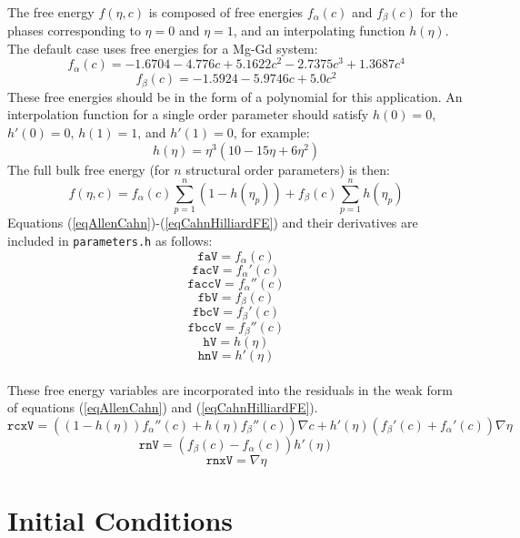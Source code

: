 \documentclass[11pt]{article}
\begin{document}
\paragraph{}
The free energy $f(\eta,c)$ is composed of free energies $f_\alpha(c)$ and $f_\beta(c)$ for the phases corresponding to $\eta=0$ and $\eta=1$, and an interpolating function $h(\eta)$.  The default case uses free energies for a Mg-Gd system:
\begin{equation}
f_\alpha(c)=-1.6704 -4.776 c+5.1622 c^2 -2.7375 c^3 +1.3687 c^4
\end{equation}
\begin{equation}
f_\beta(c)=-1.5924 -5.9746 c+5.0 c^2
\end{equation}
These free energies should be in the form of a polynomial for this application.  An interpolation function for a single order parameter should satisfy $h(0)=0$, $h'(0)=0$, $h(1)=1$, and $h'(1)=0$, for example:
\begin{equation}
h(\eta)= \eta^3 (10 - 15 \eta + 6 \eta^2)
\end{equation}
The full bulk free energy (for $n$ structural order parameters) is then:
\begin{equation}
f(\eta, c)= f_\alpha(c) \sum_{p=1}^n (1-h(\eta_p)) + f_\beta(c) \sum_{p=1}^n h(\eta_p)
\end{equation}
Equations (\ref{eqAllenCahn})-(\ref{eqCahnHilliardFE}) and their derivatives are included in \texttt{parameters.h} as follows:
\[ \texttt{faV} = f_\alpha(c) \]
\[ \texttt{facV}  = f_\alpha'(c) \]
\[ \texttt{faccV} = f_\alpha''(c) \]
\[ \texttt{fbV} = f_\beta(c) \]
\[ \texttt{fbcV} = f_\beta'(c) \]
\[ \texttt{fbccV}  = f_\beta''(c) \]
\[ \texttt{hV} = h(\eta) \]
\[ \texttt{hnV} = h'(\eta) \]
\paragraph{}
These free energy variables are incorporated into the residuals in the weak form of equations (\ref{eqAllenCahn}) and (\ref{eqCahnHilliardFE}).
\[ \texttt{rcxV} = \left( (1-h(\eta)) f_\alpha''(c) + h(\eta) f_\beta''(c) \right) \nabla c + h'(\eta)(f_\beta'(c)+f_\alpha'(c)) \nabla \eta \]
\[ \texttt{rnV} =( f_\beta(c)-f_\alpha(c)) h'(\eta) \]
\[ \texttt{rnxV} = \nabla \eta \]


\section{Initial Conditions}
\end{document}
